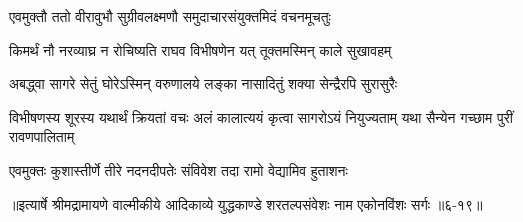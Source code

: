 \twolineshloka
{एवमुक्तौ ततो वीरावुभौ सुग्रीवलक्ष्मणौ}
{समुदाचारसंयुक्तमिदं वचनमूचतुः} %

\twolineshloka
{किमर्थं नौ नरव्याघ्र न रोचिष्यति राघव}
{विभीषणेन यत् तूक्तमस्मिन् काले सुखावहम्} %

\twolineshloka
{अबद्ध्वा सागरे सेतुं घोरेऽस्मिन् वरुणालये}
{लङ्का नासादितुं शक्या सेन्द्रैरपि सुरासुरैः} %

\threelineshloka
{विभीषणस्य शूरस्य यथार्थं क्रियतां वचः}
{अलं कालात्ययं कृत्वा सागरोऽयं नियुज्यताम्}
{यथा सैन्येन गच्छाम पुरीं रावणपालिताम्} %

\twolineshloka
{एवमुक्तः कुशास्तीर्णे तीरे नदनदीपतेः}
{संविवेश तदा रामो वेद्यामिव हुताशनः} %


॥इत्यार्षे श्रीमद्रामायणे वाल्मीकीये आदिकाव्ये युद्धकाण्डे शरतल्पसंवेशः नाम एकोनविंशः सर्गः ॥६-१९॥
